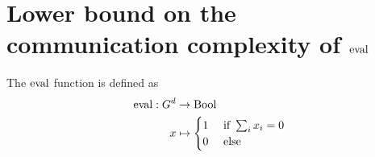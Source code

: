 \chapter{Lower bound on the communication complexity of $\operatorname{eval}$}

\begin{definition}
  \label{def:eval}

  The $\operatorname{eval}$ function is defined as
  \begin{align}
      \operatorname{eval} : G^d & \to \operatorname{Bool} \\
      x & \mapsto \begin{cases}
      1 & \text{ if } \sum_i x_i = 0 \\
      0 & \text{ else}
    \end{cases}
  \end{align}
\end{definition}
